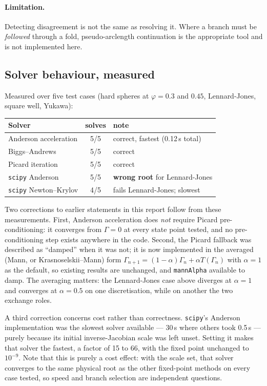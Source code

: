 \documentclass[11pt,a4paper]{article}
\newcommand{\code}[1]{\texttt{\hspace{0pt}#1}}
\begin{document}
\paragraph{Limitation.} Detecting disagreement is not the same as resolving
it. Where a branch must be \emph{followed} through a fold, pseudo-arclength
continuation is the appropriate tool and is not implemented here.

\subsection{Solver behaviour, measured}

Measured over five test cases (hard spheres at $\varphi = 0.3$ and $0.45$,
Lennard-Jones, square well, Yukawa):

\begin{center}\small
\begin{tabular}{lcl}
\toprule
Solver & solves & note\\
\midrule
Anderson acceleration & 5/5 & correct, fastest (0.12\,s total)\\
Biggs--Andrews & 5/5 & correct\\
Picard iteration & 5/5 & correct\\
\code{scipy} Anderson & 5/5 & \textbf{wrong root} for Lennard-Jones\\
\code{scipy} Newton--Krylov & 4/5 & fails Lennard-Jones; slowest\\
\bottomrule
\end{tabular}
\end{center}

Two corrections to earlier statements in this report follow from these
measurements. First, Anderson acceleration does \emph{not} require Picard
pre-conditioning: it converges from $\Gamma = 0$ at every state point tested,
and no pre-conditioning step exists anywhere in the code. Second, the Picard
fallback was described as ``damped'' when it was not; it is now implemented in
the averaged (Mann, or Krasnoselskii--Mann) form
$\Gamma_{n+1} = (1-\alpha)\Gamma_n + \alpha T(\Gamma_n)$ with $\alpha = 1$ as
the default, so existing results are unchanged, and \code{mannAlpha} available
to damp. The averaging matters: the Lennard-Jones case above diverges at
$\alpha = 1$ and converges at $\alpha = 0.5$ on one discretisation, while on
another the two exchange roles.

A third correction concerns cost rather than correctness. \code{scipy}'s
Anderson implementation was the slowest solver available --- 30\,s where
others took 0.5\,s --- purely because its initial inverse-Jacobian scale was
left unset. Setting it makes that solver the fastest, a factor of 15 to 66,
with the fixed point unchanged to $10^{-9}$. Note that this is purely a cost
effect: with the scale set, that solver converges to the same physical root
as the other fixed-point methods on every case tested, so speed and branch
selection are independent questions.
\end{document}
